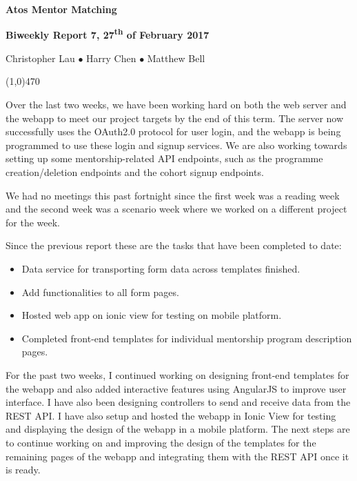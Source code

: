 \documentclass[11pt]{report}
\begin{document}
\centerline{{\LARGE \bf Atos Mentor Matching}}

\centerline{\large \bf Biweekly Report 7, 27\textsuperscript{th} of February 2017}
\centerline{Christopher Lau $\bullet$ Harry Chen $\bullet$ Matthew Bell }
\noindent
\line(1,0){470}\\


\smallskip

\noindent
Over the last two weeks, we have been working hard on both the web server and
the webapp to meet our project targets by the end of this term. The server now
successfully uses the OAuth2.0 protocol for user login, and the webapp is being
programmed to use these login and signup services. We are also working towards
setting up some mentorship-related API endpoints, such as the programme
creation/deletion endpoints and the cohort signup endpoints.

\bigskip
{}
\smallskip

\noindent
We had no meetings this past fortnight since the first week was a reading week
and the second week was a scenario week where we worked on a different project
for the week.

\bigskip
{}
\smallskip

\noindent
Since the previous report these are the tasks that have been completed to date:
\begin{itemize}
    \item Data service for transporting form data across templates finished.
    \item Add functionalities to all form pages.
    \item Hosted web app on ionic view for testing on mobile platform.
    \item Completed front-end templates for individual mentorship program description pages.
\end{itemize}

\bigskip
{}
\smallskip

\noindent
For the past two weeks, I continued working on designing front-end templates for
the webapp and also added interactive features using AngularJS to improve user
interface. I have also been designing controllers to send and receive data from
the REST API\@. I have also setup and hosted the webapp in Ionic View for testing
and displaying the design of the webapp in a mobile platform. The next steps are
to continue working on and improving the design of the templates for the
remaining pages of the webapp and integrating them with the REST API once it is
ready.
\end{document}
